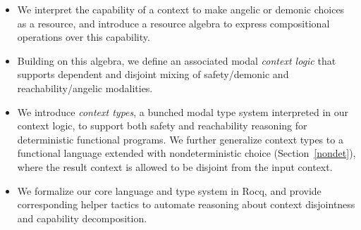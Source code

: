 \begin{itemize}[leftmargin=*]
\item We interpret the capability of a context to make angelic or
  demonic choices as a resource, and introduce a resource algebra to
  express compositional operations over this capability.
\item Building on this algebra, we define an associated modal
  \emph{context logic} that supports dependent and disjoint mixing of
  safety/demonic and reachability/angelic modalities.
\item We introduce \emph{context types}, a bunched modal type system
  interpreted in our context logic, to support both safety and
  reachability reasoning for deterministic functional programs. We
  further generalize context types to a functional language extended
  with nondeterministic choice (Section~\ref{nondet}), where the
  result context is allowed to be disjoint from the input context.
\item We formalize our core language and type system in Rocq, and
  provide corresponding helper tactics to automate reasoning about
  context disjointness and capability decomposition.
\end{itemize}

